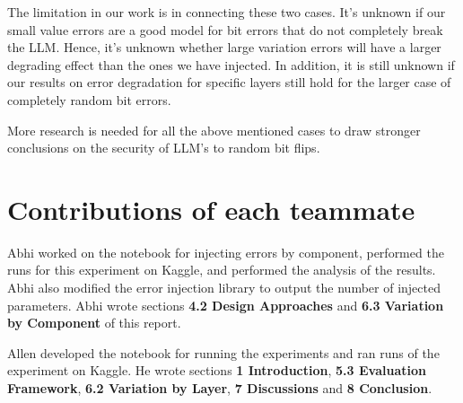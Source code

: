 The limitation in our work is in connecting these two cases. It's unknown if our small value errors are a good model for bit errors that do not completely break the LLM. Hence, it's unknown whether
large variation errors will have a larger degrading effect than the ones we have injected. In addition, it is still unknown if our results on error degradation for specific layers still hold for
the larger case of completely random bit errors.

More research is needed for all the above mentioned cases to draw stronger conclusions on the security of LLM's to random bit flips.

\section{Contributions of each teammate}
Abhi worked on the notebook for injecting errors by component, performed the runs for this experiment on Kaggle, and performed the analysis of the results. Abhi also modified the error injection library to output the number of injected parameters. Abhi wrote sections \textbf{4.2 Design Approaches} and \textbf{6.3 Variation by Component} of this report.

Allen developed the notebook for running the experiments and ran runs of the experiment on Kaggle. He wrote sections \textbf{1 Introduction}, \textbf{5.3 Evaluation Framework}, \textbf{6.2 Variation by Layer}, \textbf{7 Discussions} and \textbf{8 Conclusion}.


